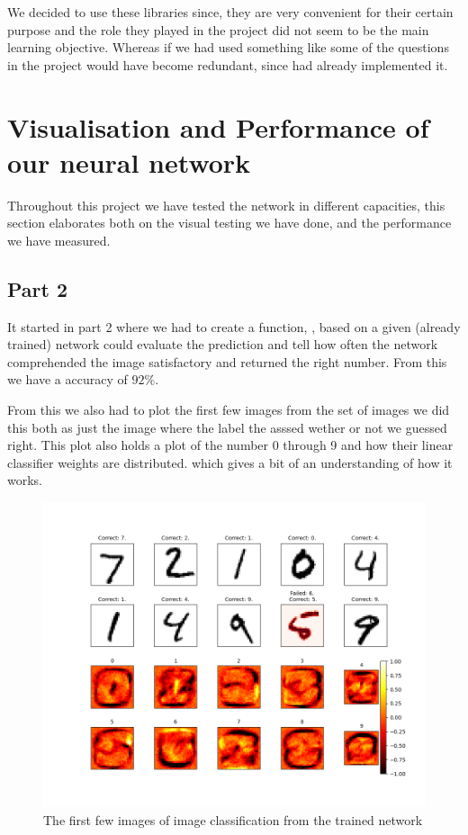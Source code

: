 \documentclass[a4paper,oneside,article,english]{memoir}
\begin{document}
We decided to use these libraries since, they are very convenient for their
certain purpose and the role they played in the project did not seem to be the
main learning objective. Whereas if we had used something like  some
of the questions in the project would have become redundant, since
 had already implemented it.



\section{Visualisation and Performance of our neural network}  
\label{ch:visualisation}
Throughout this project we have tested the network in different capacities, this
section elaborates both on the visual testing we have done, and the performance
we have measured.
\subsection{Part 2}
It started in part 2 where we had to create a function, , based on a given (already trained) network could evaluate the prediction and tell how often the network comprehended the image satisfactory and returned the right number. From this we have a accuracy of $92\%$. 

From this we also had to plot the first few images from the set of images we did this both as just the image where the label the asssed wether or not we guessed right. This plot also holds a plot of the number 0 through 9 and how their linear classifier weights are distributed. which gives a bit of an understanding of how it works.

\begin{figure}[H]
    \centering
    \includegraphics[scale = 0.5]{plot_image_eval.png}
    \caption{The first few images of image classification from the trained network}
    \label{fig:evaluation}
\end{figure}
\end{document}
